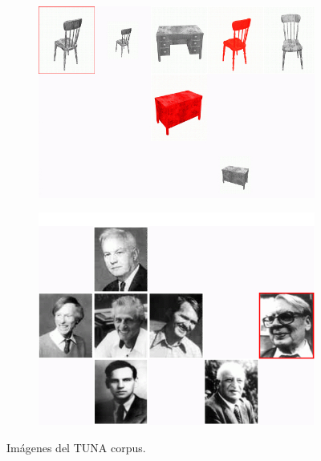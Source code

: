 \begin{figure}[!ht]
\begin{subfigure}{.5\textwidth}
\centering
\vspace*{.1cm}
\includegraphics[width=\textwidth]{images/largeGreyChair.jpg}\\[0pt]
\caption{}
\label{fig-TUNA-furniture}
\end{subfigure}
\hspace*{0cm}
\begin{subfigure}{.5\textwidth}
\centering
\vspace*{-.8cm}
\includegraphics[width=\textwidth]{images/tuna-people.jpg}\\[0pt]
\caption{}
\label{fig-TUNA-people}
\end{subfigure}
\caption{Im\'agenes del TUNA corpus.}\label{imagenes-tuna}
\end{figure}


